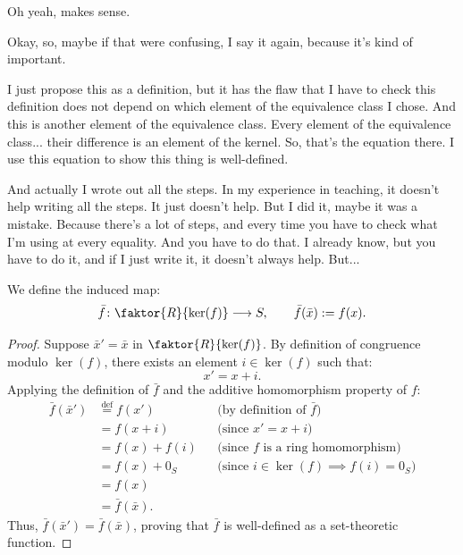 \begin{proofWrapper}
\begin{student}
Oh yeah, makes sense.
\end{student}

\begin{speech}[00:57:48 - 00:58:44]
Okay, so, maybe if that were confusing, I say it again, because it's kind of important. 

I just propose this as a definition, but it has the flaw that I have to check this definition does not depend on which element of the equivalence class I chose. And this is another element of the equivalence class. Every element of the equivalence class... their difference is an element of the kernel. So, that's the equation there. I use this equation to show this thing is well-defined. 

And actually I wrote out all the steps. In my experience in teaching, it doesn't help writing all the steps. It just doesn't help. But I did it, maybe it was a mistake. Because there's a lot of steps, and every time you have to check what I'm using at every equality. And you have to do that. I already know, but you have to do it, and if I just write it, it doesn't always help. But...
\end{speech}

\begin{content}
We define the induced map:
\begin{equation}\label{eq:induced-map-def}
\bar{f} \colon \faktor{R}{\ker(f)} \longrightarrow S, \qquad \bar{f}(\bar{x}) := f(x).
\end{equation}


\begin{proof}
Suppose $\bar{x}' = \bar{x}$ in $\faktor{R}{\ker(f)}$. By definition of congruence modulo $\ker(f)$, there exists an element $i \in \ker(f)$ such that:
\[
x' = x + i.
\]
Applying the definition of $\bar{f}$ and the additive homomorphism property of $f$:
\begin{align*}
\bar{f}(\bar{x}') &\stackrel{\text{def}}{=} f(x') && \text{(by definition of $\bar{f}$)} \\
&= f(x + i) && \text{(since $x' = x + i$)} \\
&= f(x) + f(i) && \text{(since $f$ is a ring homomorphism)} \\
&= f(x) + 0_S && \text{(since $i \in \ker(f) \implies f(i) = 0_S$)} \\
&= f(x) \\
&= \bar{f}(\bar{x}).
\end{align*}
Thus, $\bar{f}(\bar{x}') = \bar{f}(\bar{x})$, proving that $\bar{f}$ is well-defined as a set-theoretic function.
\end{proof}
\end{content}


\end{proofWrapper}
